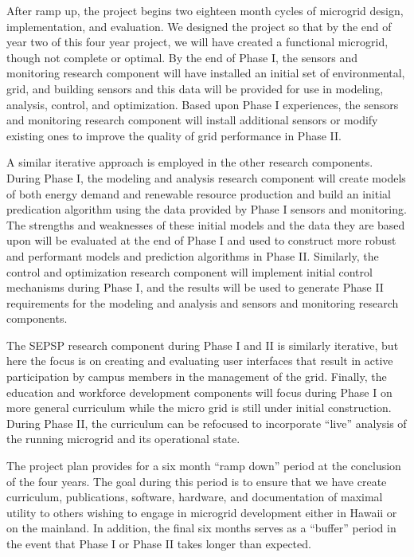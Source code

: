 After ramp up, the project begins two eighteen month cycles of microgrid
design, implementation, and evaluation.   We designed the project
so that by the end of year two of this four year project, we will have
created a functional microgrid, though not complete or optimal. 
By the end of Phase I, the sensors and monitoring research component will
have installed an initial set of environmental, grid, and building
sensors and this data will be provided for use in modeling, analysis,
control, and optimization.  Based upon Phase I experiences, the sensors and
monitoring research component will install additional sensors or modify
existing ones to improve the quality of grid performance in Phase II.

A similar iterative approach is employed in the other research
components. During Phase I, the modeling and analysis research component
will create models of both energy demand and renewable resource production
and build an initial predication algorithm using the data provided by Phase
I sensors and monitoring.  The strengths and weaknesses of these initial
models and the data they are based upon will be evaluated at the end of
Phase I and used to construct more robust and performant models and
prediction algorithms in Phase II.  Similarly, the control and optimization
research component will implement initial control mechanisms during Phase
I, and the results will be used to generate Phase II requirements for the
modeling and analysis and sensors and monitoring research components.   

The SEPSP research component during Phase I and II is similarly iterative,
but here the focus is on creating and evaluating user interfaces that
result in active participation by campus members in the management of the
grid.  Finally, the education and workforce development components will
focus during Phase I on more general curriculum while the micro grid is
still under initial construction.  During Phase II, the curriculum can be
refocused to incorporate ``live'' analysis of the running microgrid and its
operational state. 

The project plan provides for a six month ``ramp down'' period at the
conclusion of the four years.  The goal during this period is to ensure
that we have create curriculum, publications, software, hardware, and
documentation of maximal utility to others wishing to engage in microgrid
development either in Hawaii or on the mainland.   In addition, the final
six months serves as a ``buffer'' period in the event that Phase I or Phase
II takes longer than expected. 






